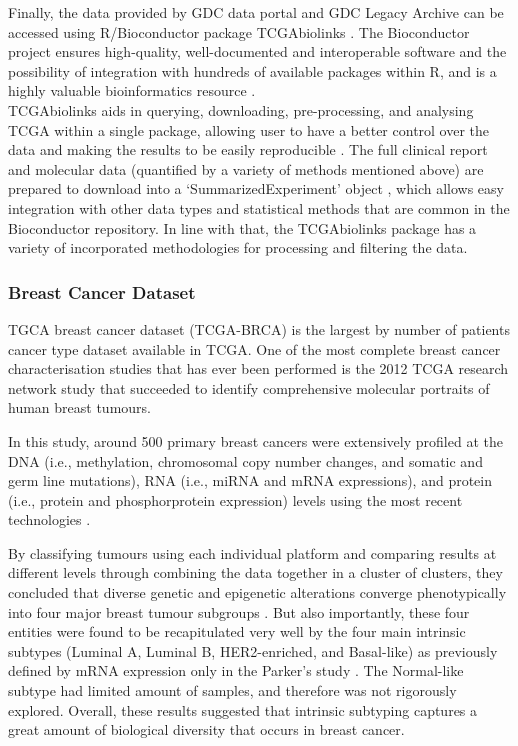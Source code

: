     Finally, the data provided by GDC data portal and GDC Legacy Archive can be accessed using R/Bioconductor package TCGAbiolinks \cite{Colaprico2016}. The Bioconductor project ensures high-quality, well-documented and interoperable software and the possibility of integration with hundreds of available packages within R, and is a highly valuable bioinformatics resource \cite{gentleman2004bioconductor}. \\TCGAbiolinks aids in querying, downloading, pre-processing, and analysing TCGA within a single package, allowing user to have a better control over the data and making the results to be easily reproducible \cite{Colaprico2016}. The full clinical report and molecular data (quantified by a variety of methods mentioned above) are prepared to download into a ‘SummarizedExperiment’ object \cite{Huber2015OrchestratingBioconductor}, which allows easy integration with other data types and statistical methods that are common in the Bioconductor repository.  In line with that, the TCGAbiolinks package has a variety of incorporated methodologies for processing and filtering the data.  
    
    \newpage
    \subsubsection{Breast Cancer Dataset}
    
    TGCA breast cancer dataset (TCGA-BRCA) is the largest by number of patients cancer type dataset available in TCGA. One of the most complete breast cancer characterisation studies that has ever been performed is the 2012 TCGA research network study \cite{TCGAComprehensiveTumors} that succeeded to identify comprehensive molecular portraits of human breast tumours. 
    
    In this study, around 500 primary breast cancers were extensively profiled at the DNA (i.e., methylation, chromosomal copy number changes, and somatic and germ line mutations), RNA (i.e., miRNA and mRNA expressions), and protein (i.e., protein and phosphorprotein expression) levels using the most recent technologies \cite{TCGAComprehensiveTumors, Vidal2017}.
    
    By classifying tumours using each individual platform and comparing results at different levels through combining the data together in a cluster of clusters, they concluded that diverse genetic and epigenetic alterations converge phenotypically into four major breast tumour subgroups \cite{TCGAComprehensiveTumors}. But also importantly, these four entities were found to be recapitulated very well by the four main intrinsic subtypes (Luminal A, Luminal B, HER2-enriched, and Basal-like) as previously defined by mRNA expression only in the Parker’s study \cite{ParkerSupervisedSubtypes}. The Normal-like subtype had limited amount of samples, and therefore was not rigorously explored. Overall, these results suggested that intrinsic subtyping captures a great amount of biological diversity that occurs in breast cancer. 
    
